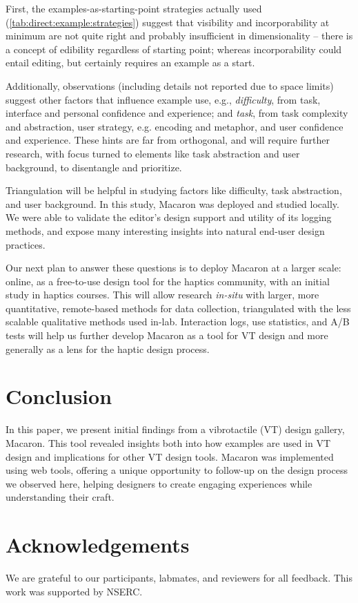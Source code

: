 First, the examples-as-starting-point strategies actually used (\autoref{tab:direct:example:strategies}) suggest that visibility and incorporability at minimum are not quite right and probably insufficient in dimensionality -- there is a concept of edibility regardless of starting point; whereas incorporability could entail editing, but certainly requires an example as a start.

Additionally, observations (including details not reported due to space limits) suggest other factors that influence example use, e.g., 
 \emph{difficulty}, from task, interface and personal confidence and experience; and
 \emph{task}, from task complexity and abstraction, user strategy, e.g. encoding and metaphor, and user confidence and experience. 
These hints are far from orthogonal, and will require further research, with focus turned to elements like task abstraction and user background, to disentangle and prioritize. 

Triangulation will be helpful in studying factors like difficulty, task abstraction, and user background.
In this study, Macaron was deployed and studied locally.
We were able to validate the editor's design support and utility of its logging methods, and expose many interesting insights into natural end-user design practices.

Our next plan to answer these questions is to deploy Macaron at a larger scale: online, as a free-to-use design tool for the haptics community, with an initial study in haptics courses.
This will allow research \emph{in-situ} with larger, more quantitative, remote-based methods for data collection, triangulated with the less scalable qualitative methods used in-lab.
Interaction logs, use statistics, and A/B tests will help us further develop Macaron as  a tool for VT design and more generally as a lens for the haptic design process.


\section{Conclusion}
In this paper, we present initial findings from a vibrotactile (VT) design gallery, Macaron.
This tool revealed insights both into how examples are used in VT design and implications for other VT design tools.
Macaron was implemented using web tools, offering a unique opportunity to follow-up on the design process we observed here, helping designers to create engaging experiences while understanding their craft.

\section{Acknowledgements}
We are grateful to our participants, labmates, and reviewers for all feedback.
This work was supported by NSERC.


\endinput
